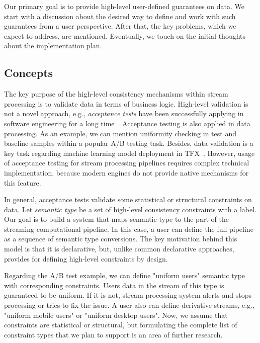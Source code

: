 \label{fs-phd-reliable}

Our primary goal is to provide high-level user-defined guarantees on data. We start with a discussion about the desired way to define and work with such guarantees from a user perspective. After that, the key problems, which we expect to address, are mentioned. Eventually, we touch on the initial thoughts about the implementation plan.

\subsection{Concepts}

The key purpose of the high-level consistency mechanisms within stream processing is to validate data in terms of business logic. High-level validation is not a novel approach, e.g., {\em acceptance tests} have been successfully applying in software engineering for a long time~\cite{hambling2013user}. Acceptance testing is also applied in data processing. As an example, we can mention uniformity checking in test and baseline samples within a popular A/B testing task. Besides, data validation is a key task regarding machine learning model deployment in TFX~\cite{Baylor:2017:TTP:3097983.3098021}. However, usage of acceptance testing for stream processing pipelines requires complex technical implementation, because modern engines do not provide native mechanisms for this feature.  

In general, acceptance tests validate some statistical or structural constraints on data. Let {\em semantic type} be a set of high-level consistency constraints with a label. Our goal is to build a system that maps semantic type to the part of the streaming computational pipeline. In this case, a user can define the full pipeline as a sequence of semantic type conversions. The key motivation behind this model is that it is declarative, but, unlike common declarative approaches, provides for defining high-level constraints by design.          

Regarding the A/B test example, we can define "uniform users" semantic type with corresponding constraints. Users data in the stream of this type is guaranteed to be uniform. If it is not, stream processing system alerts and stops processing or tries to fix the issue. A user also can define derivative streams, e.g., "uniform mobile users" or "uniform desktop users". Now, we assume that constraints are statistical or structural, but formulating the complete list of constraint types that we plan to support is an area of further research. 

